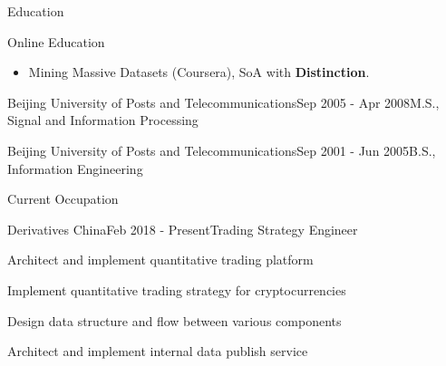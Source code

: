 \documentclass{resume} %
\begin{document}
\begin{rSection}{Education}
\begin{rSubsection}{Online Education}{}{}{}
  \begin{itemize}\vspace{-0.6em}
    \item Mining Massive Datasets (Coursera), SoA with \textbf{Distinction}.
  \end{itemize}
\end{rSubsection}

\begin{rSubsection}{Beijing University of Posts and Telecommunications}{Sep 2005 - Apr 2008}{M.S., Signal and Information Processing}{}
\end{rSubsection}

\begin{rSubsection}{Beijing University of Posts and Telecommunications}{Sep 2001 - Jun 2005}{B.S., Information Engineering}{}
\end{rSubsection}

\end{rSection}



\begin{rSection}{Current Occupation}

\begin{rSubsection}{Derivatives China}{Feb 2018 - Present}{Trading Strategy Engineer}{}{}
\begin{rSubsectionList}
\item Architect and implement quantitative trading platform
\item Implement quantitative trading strategy for cryptocurrencies
\item Design data structure and flow between various components 
\item Architect and implement internal data publish service
\end{rSubsectionList}
\end{rSubsection}
\end{rSection}
\end{document}
